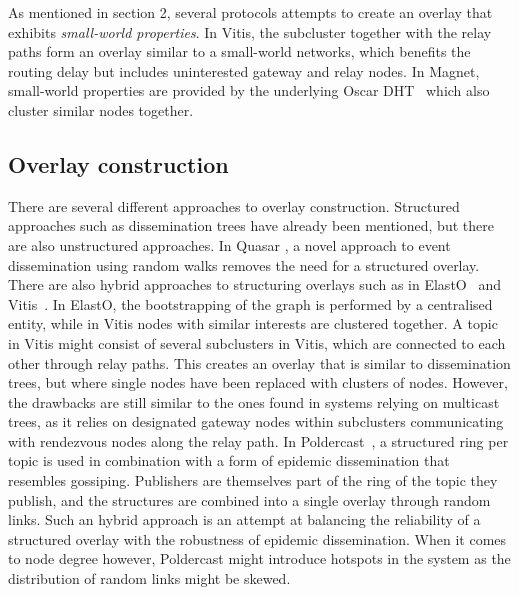 As mentioned in section 2, several protocols attempts to create an overlay that
exhibits \emph{small-world properties}. In Vitis, the subcluster
together with the relay paths form an overlay similar to a small-world
networks, which benefits the routing delay but includes
uninterested gateway and relay nodes. In Magnet, small-world properties
are provided by the underlying Oscar DHT~\cite{girdzijauskas2007oscar}
which also cluster similar nodes together.

\subsection{Overlay construction}

There are several different approaches to overlay construction.
Structured approaches such as dissemination trees have already been
mentioned, but there are also unstructured approaches. In Quasar
\cite{Wong:2008}, a novel approach to event dissemination using random
walks removes the need for a structured overlay.  There are also hybrid
approaches to structuring overlays such as in ElastO~\cite{Chen:2013}
and Vitis~\cite{Rahimian:2011}. In ElastO, the bootstrapping of the
graph is performed by a centralised entity, while in Vitis nodes with
similar interests are clustered together. A topic in Vitis might consist
of several subclusters in Vitis, which are connected to each other
through relay paths. This creates an overlay that is similar to
dissemination trees, but where single nodes have been replaced with
clusters of nodes. However, the drawbacks are still similar to the ones
found in systems relying on multicast trees, as it relies on designated
gateway nodes within subclusters communicating with rendezvous nodes
along the relay path. In Poldercast~\cite{Setty:2012}, a structured ring
per topic is used in combination with a form of epidemic dissemination
that resembles gossiping. Publishers are themselves part of the ring of
the topic they publish, and the structures are combined into a single
overlay through random links. Such an hybrid approach is an attempt at
balancing the reliability of a structured overlay with the robustness of
epidemic dissemination. When it comes to node degree however, Poldercast
might introduce hotspots in the system as the distribution of random
links might be skewed.

